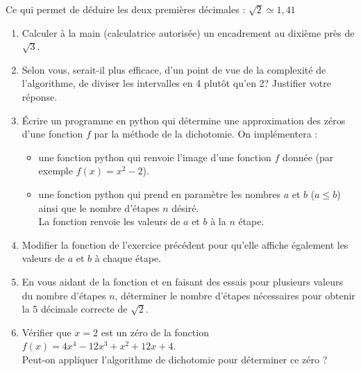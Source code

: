 \documentclass[11pt,a4paper,twoside,greek]{report}
\begin{document}
Ce qui permet de déduire les deux premières décimales :
$\sqrt{2}\simeq 1,41$


\bigskip
\begin{boxexstheorieligne}
\begin{enumerate}[label=\textbf{E\thechapter.\arabic*},itemsep=4mm]
\item Calculer à la main (calculatrice autorisée) un encadrement au dixième près
 de $\sqrt{3}$.
\item Selon vous, serait-il plus efficace, d'un point de vue de la complexité de l'algorithme, de diviser les intervalles en 4 plutôt qu'en 2? Justifier votre réponse.
\item Écrire un programme en python qui détermine une approximation des zéros d'une fonction $f$ par la méthode de la dichotomie. On implémentera :
\vspace{-1mm} 
\begin{itemize}
\item une fonction python qui renvoie l'image d'une fonction $f$ donnée ({\small par exemple $f(x)=x^2-2$}).
\item une fonction python  qui prend en paramètre les nombres $a$ et $b$ ($a\leqslant b$) ainsi que le nombre d'étapes $n$ désiré.\\
La fonction renvoie les valeurs de $a$ et $b$ à la $n$ étape.
\end{itemize}
\item Modifier la fonction  de l'exercice précédent pour qu'elle affiche également les valeurs de $a$ et $b$ à chaque étape.
\item\label{dicho_racine_2} En vous aidant de la fonction  et en faisant des essais pour plusieurs valeurs du nombre d'étapes $n$, déterminer le nombre d'étapes nécessaires pour obtenir la 5 décimale correcte de $\sqrt{2}$.
\item Vérifier que $x=2$ est un zéro de la fonction $f(x)=4x^4-12x^3+x^2+12x+4$.\\
Peut-on appliquer l'algorithme de dichotomie pour déterminer ce zéro ? 
\end{enumerate}
\end{boxexstheorieligne}



%
\end{document}
